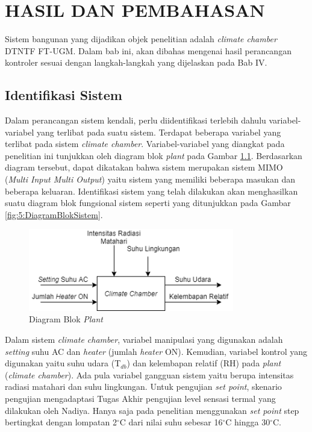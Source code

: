 \chapter{HASIL DAN PEMBAHASAN}
\label{hasil-dan-pembahasan}
Sistem bangunan yang dijadikan objek penelitian adalah \textit{climate chamber} DTNTF FT-UGM. Dalam bab ini, akan dibahas mengenai hasil perancangan kontroler sesuai dengan langkah-langkah yang dijelaskan pada Bab IV.

\section{Identifikasi Sistem}

Dalam perancangan sistem kendali, perlu diidentifikasi terlebih dahulu variabel-variabel yang terlibat pada suatu sistem. Terdapat beberapa variabel yang terlibat pada sistem \textit{climate chamber}. Variabel-variabel yang diangkat pada penelitian ini tunjukkan oleh diagram blok \textit{plant} pada Gambar \ref{fig:5:DiagramBlokPlant}. Berdasarkan diagram tersebut, dapat dikatakan bahwa sistem merupakan sistem MIMO (\textit{Multi Input Multi Output}) yaitu sistem yang memiliki beberapa masukan dan beberapa keluaran. Identifikasi sistem yang telah dilakukan akan menghasilkan suatu diagram blok fungsional sistem seperti yang ditunjukkan pada Gambar \ref{fig:5:DiagramBlokSistem}.\\

\begin{figure}[!h]
	\centering
	\includegraphics[width=0.8\textwidth]{figures/BlokDiagramPlant}
	\caption{Diagram Blok \textit{Plant}}
	\label{fig:5:DiagramBlokPlant}
\end{figure}
\vspace{1em}

Dalam sistem \textit{climate chamber}, variabel manipulasi yang digunakan adalah \textit{setting} suhu AC dan \textit{heater} (jumlah \textit{heater} ON). Kemudian, variabel kontrol yang digunakan yaitu suhu udara (T$_{db}$) dan kelembapan relatif (RH) pada \textit{plant} (\textit{climate chamber}). Ada pula variabel gangguan sistem yaitu berupa intensitas radiasi matahari dan suhu lingkungan. Untuk pengujian \textit{set point}, skenario pengujian mengadaptasi Tugas Akhir pengujian level sensasi termal yang dilakukan oleh Nadiya\cite{skripsiMuna}. Hanya saja pada penelitian menggunakan \textit{set point} step bertingkat dengan lompatan 2$^{\circ}$C dari nilai suhu sebesar 16$^{\circ}$C hingga 30$^{\circ}$C.

